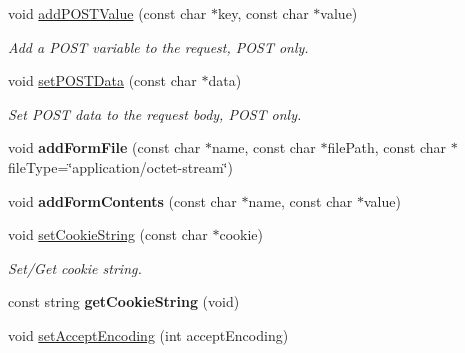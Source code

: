 \begin{DoxyCompactItemize}
\mbox{\label{classHTTPRequest_a82bab4dd8ddfeb8caf3f2addb0876b7b}} 
void \hyperlink{classHTTPRequest_a82bab4dd8ddfeb8caf3f2addb0876b7b}{add\+P\+O\+S\+T\+Value} (const char $\ast$key, const char $\ast$value)
\begin{DoxyCompactList}\small\item\em Add a P\+O\+ST variable to the request, P\+O\+ST only. \end{DoxyCompactList}\item 
\mbox{\label{classHTTPRequest_ac570006c5db87ccee64885f15df3661f}} 
void \hyperlink{classHTTPRequest_ac570006c5db87ccee64885f15df3661f}{set\+P\+O\+S\+T\+Data} (const char $\ast$data)
\begin{DoxyCompactList}\small\item\em Set P\+O\+ST data to the request body, P\+O\+ST only. \end{DoxyCompactList}\item 
\mbox{\label{classHTTPRequest_a4bccc607711858b3f8902c714aa45fc8}} 
void {\bfseries add\+Form\+File} (const char $\ast$name, const char $\ast$file\+Path, const char $\ast$file\+Type=\char`\"{}application/octet-\/stream\char`\"{})
\item 
\mbox{\label{classHTTPRequest_ab104f5d95a6f5bf3c61f3db646b5e1db}} 
void {\bfseries add\+Form\+Contents} (const char $\ast$name, const char $\ast$value)
\item 
\mbox{\label{classHTTPRequest_aa0ea043ee12472004e29f0dd3d39d499}} 
void \hyperlink{classHTTPRequest_aa0ea043ee12472004e29f0dd3d39d499}{set\+Cookie\+String} (const char $\ast$cookie)
\begin{DoxyCompactList}\small\item\em Set/\+Get cookie string. \end{DoxyCompactList}\item 
\mbox{\label{classHTTPRequest_a15cef2a3d32a08159501ec76ae9af1cf}} 
const string {\bfseries get\+Cookie\+String} (void)
\item 
\mbox{\label{classHTTPRequest_af24be8ab7517999522aa7b27e55cc0f0}} 
void \hyperlink{classHTTPRequest_af24be8ab7517999522aa7b27e55cc0f0}{set\+Accept\+Encoding} (int accept\+Encoding)

\end{DoxyCompactItemize}
